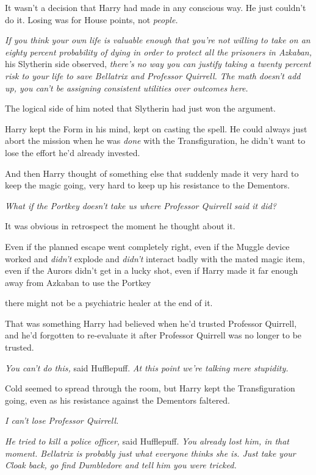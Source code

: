 It wasn't a decision that Harry had made in any conscious way. He just couldn't
do it. Losing was for House points, not \emph{people.}

\emph{If you think your own life is valuable enough that you're not willing to
take on an eighty percent probability of dying in order to protect all the
prisoners in Azkaban,} his Slytherin side observed, \emph{there's no way you
can justify taking a twenty percent risk to your life to save Bellatrix and
Professor Quirrell. The math doesn't add up, you can't be assigning consistent
utilities over outcomes here.}

The logical side of him noted that Slytherin had just won the argument.

Harry kept the Form in his mind, kept on casting the spell. He could always
just abort the mission when he was \emph{done} with the Transfiguration, he
didn't want to lose the effort he'd already invested.

And then Harry thought of something else that suddenly made it very hard to
keep the magic going, very hard to keep up his resistance to the Dementors.

\emph{What if the Portkey doesn't take us where Professor Quirrell said it did?}

It was obvious in retrospect the moment he thought about it.

Even if the planned escape went completely right, even if the Muggle device
worked and \emph{didn't} explode and \emph{didn't} interact badly with the
mated magic item, even if the Aurors didn't get in a lucky shot, even if Harry
made it far enough away from Azkaban to use the Portkey{\el}

{\el} there might not be a psychiatric healer at the end of it.

That was something Harry had believed when he'd trusted Professor Quirrell, and
he'd forgotten to re-evaluate it after Professor Quirrell was no longer to be
trusted.

\emph{You can't do this,} said Hufflepuff.  \emph{At this point we're talking
mere stupidity.}

Cold seemed to spread through the room, but Harry kept the Transfiguration
going, even as his resistance against the Dementors faltered.

\emph{I can't lose Professor Quirrell.}

\emph{He tried to kill a police officer,} said Hufflepuff. \emph{You already
lost him, in that moment. Bellatrix is probably just what everyone thinks she
is. Just take your Cloak back, go find Dumbledore and tell him you were
tricked.}

